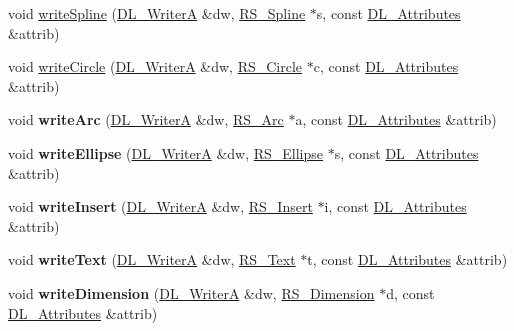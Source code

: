 \begin{DoxyCompactItemize}
\item 
void \hyperlink{classRS__FilterDXF_ae627cb3b3af25ed8996d5e8a665bd314}{write\-Spline} (\hyperlink{classDL__WriterA}{D\-L\-\_\-\-Writer\-A} \&dw, \hyperlink{classRS__Spline}{R\-S\-\_\-\-Spline} $\ast$s, const \hyperlink{classDL__Attributes}{D\-L\-\_\-\-Attributes} \&attrib)
\item 
void \hyperlink{classRS__FilterDXF_a4d0453bb64d10ca54cf8db71c56eb032}{write\-Circle} (\hyperlink{classDL__WriterA}{D\-L\-\_\-\-Writer\-A} \&dw, \hyperlink{classRS__Circle}{R\-S\-\_\-\-Circle} $\ast$c, const \hyperlink{classDL__Attributes}{D\-L\-\_\-\-Attributes} \&attrib)
\item 
\hypertarget{classRS__FilterDXF_ab090cf521e68404f6b790b7c777a0d0f}{void {\bfseries write\-Arc} (\hyperlink{classDL__WriterA}{D\-L\-\_\-\-Writer\-A} \&dw, \hyperlink{classRS__Arc}{R\-S\-\_\-\-Arc} $\ast$a, const \hyperlink{classDL__Attributes}{D\-L\-\_\-\-Attributes} \&attrib)}\label{classRS__FilterDXF_ab090cf521e68404f6b790b7c777a0d0f}

\item 
\hypertarget{classRS__FilterDXF_a46744668ae9bd2b7b693a9c23f63eedd}{void {\bfseries write\-Ellipse} (\hyperlink{classDL__WriterA}{D\-L\-\_\-\-Writer\-A} \&dw, \hyperlink{classRS__Ellipse}{R\-S\-\_\-\-Ellipse} $\ast$s, const \hyperlink{classDL__Attributes}{D\-L\-\_\-\-Attributes} \&attrib)}\label{classRS__FilterDXF_a46744668ae9bd2b7b693a9c23f63eedd}

\item 
\hypertarget{classRS__FilterDXF_a4d54731718eaadbbbb41553ed2f1d090}{void {\bfseries write\-Insert} (\hyperlink{classDL__WriterA}{D\-L\-\_\-\-Writer\-A} \&dw, \hyperlink{classRS__Insert}{R\-S\-\_\-\-Insert} $\ast$i, const \hyperlink{classDL__Attributes}{D\-L\-\_\-\-Attributes} \&attrib)}\label{classRS__FilterDXF_a4d54731718eaadbbbb41553ed2f1d090}

\item 
\hypertarget{classRS__FilterDXF_a63a4dd38e437a19b47510201eada2fdf}{void {\bfseries write\-Text} (\hyperlink{classDL__WriterA}{D\-L\-\_\-\-Writer\-A} \&dw, \hyperlink{classRS__Text}{R\-S\-\_\-\-Text} $\ast$t, const \hyperlink{classDL__Attributes}{D\-L\-\_\-\-Attributes} \&attrib)}\label{classRS__FilterDXF_a63a4dd38e437a19b47510201eada2fdf}

\item 
\hypertarget{classRS__FilterDXF_a52b8b95a76ca48a03b21a05055937482}{void {\bfseries write\-Dimension} (\hyperlink{classDL__WriterA}{D\-L\-\_\-\-Writer\-A} \&dw, \hyperlink{classRS__Dimension}{R\-S\-\_\-\-Dimension} $\ast$d, const \hyperlink{classDL__Attributes}{D\-L\-\_\-\-Attributes} \&attrib)}\label{classRS__FilterDXF_a52b8b95a76ca48a03b21a05055937482}


\end{DoxyCompactItemize}
